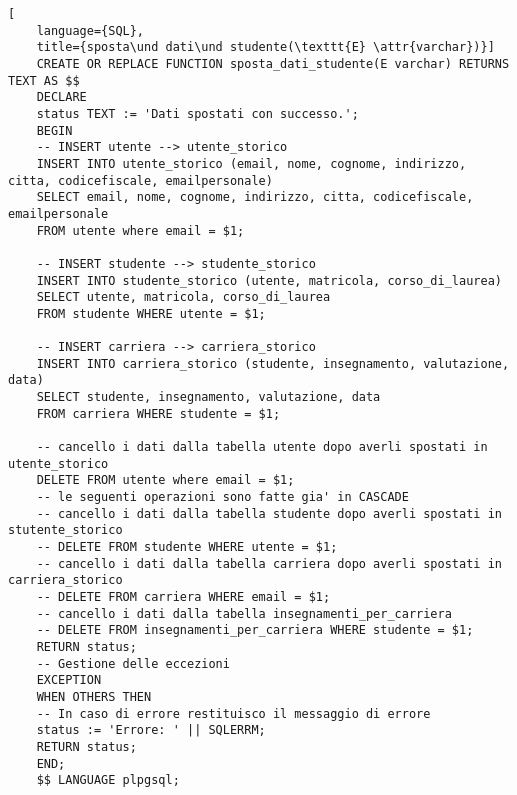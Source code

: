 \documentclass{article}
\newcommand{\attr}[1]{\texttt{\textcolor{gray}{#1}}}
\newcommand{\und}[0]{\textunderscore}
\begin{document}
    \pagebreak
    \begin{lstlisting}[
    language={SQL},
    title={sposta\und dati\und studente(\texttt{E} \attr{varchar})}]
    CREATE OR REPLACE FUNCTION sposta_dati_studente(E varchar) RETURNS TEXT AS $$
    DECLARE
    status TEXT := 'Dati spostati con successo.';
    BEGIN
    -- INSERT utente --> utente_storico
    INSERT INTO utente_storico (email, nome, cognome, indirizzo, citta, codicefiscale, emailpersonale)
    SELECT email, nome, cognome, indirizzo, citta, codicefiscale, emailpersonale
    FROM utente where email = $1;

    -- INSERT studente --> studente_storico
    INSERT INTO studente_storico (utente, matricola, corso_di_laurea)
    SELECT utente, matricola, corso_di_laurea
    FROM studente WHERE utente = $1;

    -- INSERT carriera --> carriera_storico
    INSERT INTO carriera_storico (studente, insegnamento, valutazione, data)
    SELECT studente, insegnamento, valutazione, data
    FROM carriera WHERE studente = $1;

    -- cancello i dati dalla tabella utente dopo averli spostati in utente_storico
    DELETE FROM utente where email = $1;
    -- le seguenti operazioni sono fatte gia' in CASCADE
    -- cancello i dati dalla tabella studente dopo averli spostati in stutente_storico
    -- DELETE FROM studente WHERE utente = $1;
    -- cancello i dati dalla tabella carriera dopo averli spostati in carriera_storico
    -- DELETE FROM carriera WHERE email = $1;
    -- cancello i dati dalla tabella insegnamenti_per_carriera
    -- DELETE FROM insegnamenti_per_carriera WHERE studente = $1;
    RETURN status;
    -- Gestione delle eccezioni
    EXCEPTION
    WHEN OTHERS THEN
    -- In caso di errore restituisco il messaggio di errore
    status := 'Errore: ' || SQLERRM;
    RETURN status;
    END;
    $$ LANGUAGE plpgsql;
\end{lstlisting}
\end{document}
